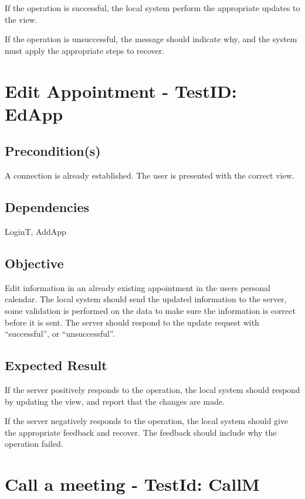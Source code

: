 \documentclass{article}
\begin{document}
If the operation is successful, the local system perform the appropriate
updates to the view.

If the operation is unsuccessful, the message should indicate why, and the
system must apply the appropriate steps to recover. \newpage

\section{Edit Appointment - TestID: EdApp}

\subsection{Precondition(s)}

A connection is already established. The user is presented with the correct
view.

\subsection{Dependencies}

LoginT, AddApp

\subsection{Objective}

Edit information in an already existing appointment in the users personal
calendar. The local system should send the updated information to the
server, some validation is performed on the data to make sure the
information is correct before it is sent. The server should respond to the
update request with ``successful'', or ``unsuccessful''.

\subsection{Expected Result}

If the server positively responds to the operation, the local system should
respond by updating the view, and report that the changes are made.

If the server negatively responds to the operation, the local system should
give the appropriate feedback and recover. The feedback should include why
the operation failed. \newpage

\section{Call a meeting - TestId: CallM}
\end{document}
